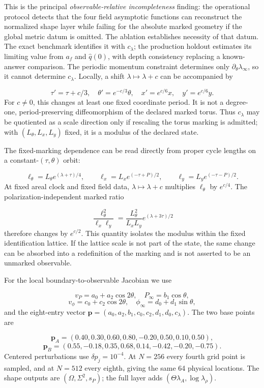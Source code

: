 \documentclass{iopjournal}
\begin{document}
This is the principal \emph{observable-relative incompleteness} finding: the operational protocol detects that the four field asymptotic functions can reconstruct the normalized shape layer while failing for the absolute marked geometry if the global metric datum is omitted. The ablation establishes necessity of that datum. The exact benchmark identifies it with $c_\lambda$; the production holdout estimates its limiting value from $a_f$ and $\widehat q(0)$, with depth consistency replacing a known-answer comparison. The periodic momentum constraint determines only $\partial_\theta\lambda_\infty$, so it cannot determine $c_\lambda$. Locally, a shift $\lambda\mapsto\lambda+c$ can be accompanied by

\[
\tau'=\tau+c/3,\quad \theta'=e^{-c/3}\theta,
\quad x'=e^{c/6}x,\quad y'=e^{c/6}y.
\]
For $c\ne0$, this changes at least one fixed coordinate period. It is not a degree-one, period-preserving diffeomorphism of the declared marked torus. Thus $c_\lambda$ may be quotiented as a scale direction only if rescaling the torus marking is admitted; with $(L_\theta,L_x,L_y)$ fixed, it is a modulus of the declared state.

The fixed-marking dependence can be read directly from proper cycle lengths on a constant-$(\tau,\theta)$ orbit:

\[
\ell_\theta=L_\theta e^{(\lambda+\tau)/4},\qquad
\ell_x=L_xe^{(-\tau+P)/2},\qquad
\ell_y=L_ye^{(-\tau-P)/2}.
\]
At fixed areal clock and fixed field data, $\lambda\mapsto\lambda+c$ multiplies $\ell_\theta$ by $e^{c/4}$. The polarization-independent marked ratio

\[
\frac{\ell_\theta^2}{\ell_x\ell_y}
=\frac{L_\theta^2}{L_xL_y}e^{(\lambda+3\tau)/2}
\]
therefore changes by $e^{c/2}$. This quantity isolates the modulus within the fixed identification lattice. If the lattice scale is not part of the state, the same change can be absorbed into a redefinition of the marking and is not asserted to be an unmarked observable.

For the local boundary-to-observable Jacobian we use

\[
v_P=a_0+a_2\cos2\theta,\quad P_\infty=b_1\cos\theta,
\]
\[
v_\phi=c_0+c_2\cos2\theta,\quad
\phi_\infty=d_0+d_1\sin\theta,
\]
and the eight-entry vector $\mathbf p=(a_0,a_2,b_1,c_0,c_2,d_1,d_0,c_\lambda)$. The two base points are

\[
\mathbf p_A=(0.40,0.30,0.60,0.80,-0.20,0.50,0.10,0.50),
\]
\[
\mathbf p_B=(0.55,-0.18,0.35,0.68,0.14,-0.42,-0.20,-0.75).
\]
Centered perturbations use $\delta p_j=10^{-4}$. At $N=256$ every fourth grid point is sampled, and at $N=512$ every eighth, giving the same 64 physical locations. The shape outputs are $(\Omega,\Sigma^2,s_P)$; the full layer adds $(\Theta\lambda_A,\log\lambda_\rho)$.
\end{document}

